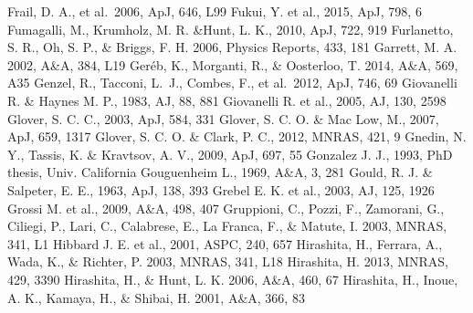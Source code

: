 \begin{thebibliography}{99}
\begin{multicols}{2}
{    Frail, D. A., et al.\ 2006, ApJ, 646, L99
        Fukui, Y. et al., 2015, ApJ, 798, 6
	Fumagalli, M., Krumholz, M. R. \&Hunt, L. K., 2010, ApJ, 722, 919
    Furlanetto, S. R., Oh, S. P., \& Briggs, F. H. 2006, Physics Reports, 433, 181
    	Garrett, M. A. 2002, A\&A, 384, L19
    	Ger\'{e}b, K., Morganti, R., \& Oosterloo, T. 2014, A\&A, 569, A35
	Genzel, R., Tacconi, L.~J., Combes, F., et al.\ 2012, ApJ, 746, 69 
	Giovanelli R. \& Haynes M. P., 1983, AJ, 88, 881
    	Giovanelli R. et al., 2005, AJ, 130, 2598
	Glover, S. C. C., 2003, ApJ, 584, 331
      Glover, S. C. O. \& Mac Low, M., 2007, ApJ, 659, 1317
	Glover, S. C. O. \& Clark, P. C., 2012, MNRAS, 421, 9
	Gnedin, N. Y., Tassis, K. \& Kravtsov, A. V., 2009, ApJ, 697, 55
	Gonzalez J. J., 1993, PhD thesis, Univ. California
	Gouguenheim L., 1969, A\&A, 3, 281
	Gould, R. J. \& Salpeter, E. E., 1963, ApJ, 138, 393
	Grebel E. K. et al., 2003, AJ, 125, 1926
	Grossi M. et al., 2009, A\&A, 498, 407
	Gruppioni, C., Pozzi, F., Zamorani, G., Ciliegi, P., Lari, C., Calabrese, E.,
    	La Franca, F., \& Matute, I. 2003, MNRAS, 341, L1
	Hibbard J. E. et al., 2001, ASPC, 240, 657
	Hirashita, H., Ferrara, A., Wada, K., \& Richter, P. 2003, MNRAS, 341, L18
    	Hirashita, H. 2013, MNRAS, 429, 3390
    	Hirashita, H., \& Hunt, L. K. 2006, A\&A, 460, 67
    	Hirashita, H., Inoue, A. K., Kamaya, H., \& Shibai, H. 2001, A\&A, 366, 83
}
\end{multicols}
\end{thebibliography}
